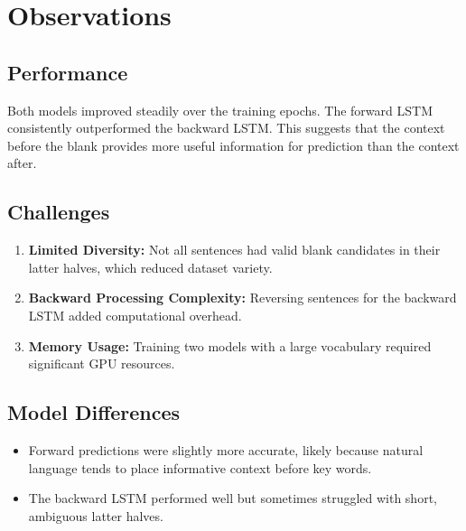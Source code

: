 \documentclass{article}
\begin{document}
\section{Observations}
\subsection{Performance}
Both models improved steadily over the training epochs. The forward LSTM consistently outperformed the backward LSTM. This suggests that the context before the blank provides more useful information for prediction than the context after.

\subsection{Challenges}
\begin{enumerate}
    \item \textbf{Limited Diversity:} Not all sentences had valid blank candidates in their latter halves, which reduced dataset variety.
    \item \textbf{Backward Processing Complexity:} Reversing sentences for the backward LSTM added computational overhead.
    \item \textbf{Memory Usage:} Training two models with a large vocabulary required significant GPU resources.
\end{enumerate}

\subsection{Model Differences}
\begin{itemize}
    \item Forward predictions were slightly more accurate, likely because natural language tends to place informative context before key words.
    \item The backward LSTM performed well but sometimes struggled with short, ambiguous latter halves.
\end{itemize}
\end{document}
